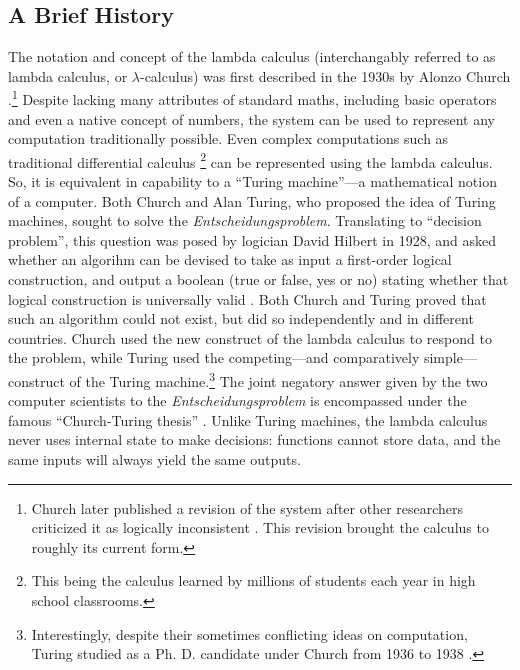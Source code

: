 \documentclass[twocolumn,titlepage,12pt]{article}
\begin{document}
\subsection{A Brief History}
The notation and concept of the lambda calculus (interchangably referred to as lambda calculus, or $\lambda$-calculus) was first described in the 1930s by Alonzo Church \cite{church}.\footnote{Church later published a revision \cite{church2} of the system after other researchers criticized it as logically inconsistent \cite{logicallyinconsistent}. This revision brought the calculus to roughly its current form.} Despite lacking many attributes of standard maths, including basic operators and even a native concept of numbers, the system can be used to represent any computation traditionally possible. Even complex computations such as traditional differential calculus \cite{differentiallc}\footnote{This being the calculus learned by millions of students each year in high school classrooms.} can be represented using the lambda calculus. So, it is equivalent in capability to a ``Turing machine''---a mathematical notion of a computer. Both Church and Alan Turing, who proposed the idea of Turing machines, sought to solve the \textit{Entscheidungsproblem}. Translating to ``decision problem'', this question was posed by logician David Hilbert in 1928, and asked whether an algorihm can be devised to take as input a first-order logical construction, and output a boolean (true or false, yes or no) stating whether that logical construction is universally valid \cite{hilbert}. Both Church and Turing proved that such an algorithm could not exist, but did so independently and in different countries. Church used the new construct of the lambda calculus to respond to the problem, while Turing used the competing---and comparatively simple---construct of the Turing machine.\footnote{Interestingly, despite their sometimes conflicting ideas on computation, Turing studied as a Ph. D. candidate under Church from 1936 to 1938 \cite{churchpapers}.} The joint negatory answer given by the two computer scientists to the \textit{Entscheidungsproblem} is encompassed under the famous ``Church-Turing thesis'' \cite{churchturingthesis}. Unlike Turing machines, the lambda calculus never uses internal state to make decisions: functions cannot store data, and the same inputs will always yield the same outputs.
\end{document}
